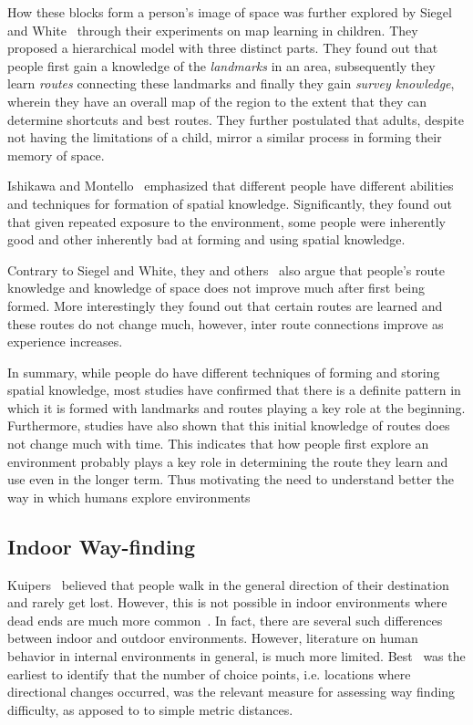 How these blocks form a person's image of space was further explored by Siegel and White~\cite{Siegel19759} through their experiments on map learning in children. They proposed a hierarchical model with three distinct parts. They found out that people first gain a knowledge of the \emph{landmarks} in an area, subsequently they learn \emph{routes} connecting these landmarks and finally they gain \emph{survey knowledge}, wherein they have an overall map of the region to the extent that they can determine shortcuts and best routes. They further postulated that adults, despite not having the limitations of a child, mirror a similar process in forming their memory of space.


 Ishikawa and Montello~\cite{Ishikawa200693} emphasized that different people have different abilities and techniques for formation of spatial knowledge. Significantly, they found out that given repeated exposure to the environment, some people were inherently good and other inherently bad at forming and using spatial knowledge.

 Contrary to Siegel and White, they and others~\cite{Moeser01011988} also argue that people's route knowledge and knowledge of space does not improve much after first being formed. More interestingly they found out that certain routes are learned and these routes do not change much, however, inter route connections improve as experience increases.

 In summary, while people do have different techniques of forming and storing spatial knowledge, most studies have confirmed that there is a definite pattern in which it is formed with landmarks and routes playing a key role at the beginning. Furthermore, studies have also shown that this initial knowledge of routes does not change much with time. This indicates that how people first explore an environment probably plays a key role in determining the route they learn and use even in the longer term. Thus motivating the need to understand better the way in which humans explore environments

\subsection{Indoor Way-finding} %
\label{sec:indoor_wayfinding}


Kuipers~\cite{Kuipers78} believed that people walk in the general direction of their destination and rarely get lost. However, this is not possible in indoor environments where dead ends are much more common~\cite{HolscherBMS06}. In fact, there are several such differences between indoor and outdoor environments. However, literature on human behavior in internal environments in general, is much more limited. Best~\cite{best1970direction} was the earliest to identify that the number of choice points, i.e. locations where directional changes occurred, was the relevant measure for assessing way finding difficulty, as apposed to to simple metric distances.

